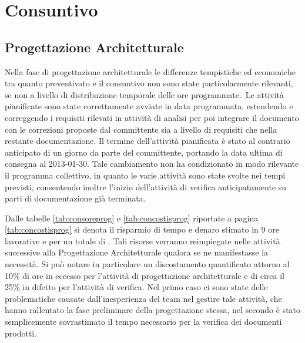 \section{Consuntivo}
\subsection{Progettazione Architetturale}
Nella fase di progettazione architetturale le differenze tempistiche ed economiche tra quanto preventivato e il consuntivo non sono state particolarmente rilevanti, se non a livello di distribuzione temporale delle ore programmate.\
Le attività pianificate sono state correttamente avviate in data programmata, estendendo e correggendo i requisiti rilevati in attività di analisi per poi integrare il documento con le correzioni proposte dal committente sia a livello di requisiti che nella restante documentazione. Il termine dell'attività pianificata è stato al contrario anticipato di un giorno da parte del committente, portando la data ultima di consegna al 2013-01-30. Tale cambiamento non ha condizionato in modo rilevante il programma collettivo, in quanto le varie attività sono state svolte nei tempi previsti, consentendo inoltre l'inizio dell'attività di verifica anticipatamente su parti di documentazione già terminata.

Dalle tabelle \ref{tab:consoreprog} e \ref{tab:concostisprog} riportate a pagina \vref{tab:concostisprog} si denota il risparmio di tempo e denaro stimato in 9 ore lavorative e per un totale di . Tali risorse verranno reimpiegate nelle attività successive alla Progettazione Architetturale qualora se ne manifestasse la necessità.
Si può notare in particolare un discostamento quantificato attorno al 10\% di ore in eccesso per l'attività di progettazione architetturale e di circa il 25\% in difetto per l'attività di verifica. Nel primo caso ci sono state delle problematiche causate dall'inesperienza del team nel gestire tale attività, che hanno rallentato la fase preliminare della progettazione stessa, nel secondo è stato semplicemente sovrastimato il tempo necessario per la verifica dei documenti prodotti.

